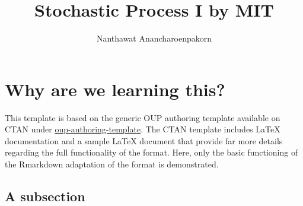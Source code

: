 \documentclass[webpdf,large,contemporary,namedate]{oup-authoring-template}
\theoremstyle{thmstyleone}
\theoremstyle{thmstyletwo}
\theoremstyle{thmstylethree}
\begin{document}




\title[]{Stochastic Process I by MIT}




\author[%
%
%
%
%
]{Nanthawat Anancharoenpakorn}











\keywords{}


\maketitle


\hypertarget{why-are-we-learning-this}{%
\section{Why are we learning this?}\label{why-are-we-learning-this}}

This template is based on the generic OUP authoring template available
on CTAN under
\href{https://www.ctan.org/pkg/oup-authoring-template}{oup-authoring-template}.
The CTAN template includes LaTeX documentation and a sample LaTeX
document that provide far more details regarding the full functionality
of the format. Here, only the basic functioning of the Rmarkdown
adaptation of the format is demonstrated.

\hypertarget{a-subsection}{%
\subsection{A subsection}\label{a-subsection}}
\end{document}
